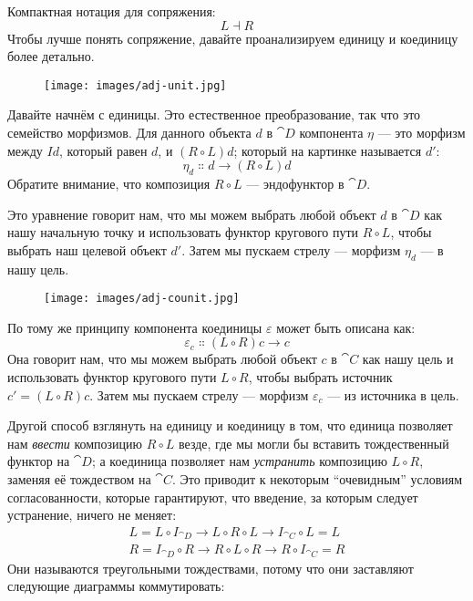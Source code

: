 Компактная нотация для сопряжения:
\[L \dashv R\]
Чтобы лучше понять сопряжение, давайте проанализируем единицу и
коединицу более детально.

\begin{figure}[H]
  \centering
  \texttt{[image: images/adj-unit.jpg]}
\end{figure}

\noindent
Давайте начнём с единицы. Это естественное преобразование, так что это
семейство морфизмов. Для данного объекта $d$ в $\cat{D}$
компонента $\eta$ --- это морфизм между $I d$, который равен
$d$, и $(R \circ L) d$; который на картинке называется
$d'$:
\[\eta_d \Colon d \to (R \circ L) d\]
Обратите внимание, что композиция $R \circ L$ --- эндофунктор в $\cat{D}$.

Это уравнение говорит нам, что мы можем выбрать любой объект $d$ в
$\cat{D}$ как нашу начальную точку и использовать функтор кругового пути
$R \circ L$, чтобы выбрать наш целевой объект $d'$. Затем мы
пускаем стрелу --- морфизм $\eta_d$ --- в нашу цель.

\begin{figure}[H]
  \centering
  \texttt{[image: images/adj-counit.jpg]}
\end{figure}

\noindent
По тому же принципу компонента коединицы $\varepsilon$ может быть описана как:
\[\varepsilon_{c} \Colon (L \circ R) c \to c\]
Она говорит нам, что мы
можем выбрать любой объект $c$ в $\cat{C}$ как нашу цель и использовать
функтор кругового пути $L \circ R$, чтобы выбрать источник
$c' = (L \circ R) c$. Затем мы пускаем стрелу --- морфизм
$\varepsilon_{c}$ --- из источника в цель.

Другой способ взглянуть на единицу и коединицу в том, что единица позволяет нам
\emph{ввести} композицию $R \circ L$ везде, где мы могли бы
вставить тождественный функтор на $\cat{D}$; а коединица позволяет нам
\emph{устранить} композицию $L \circ R$, заменяя её
тождеством на $\cat{C}$. Это приводит к некоторым ``очевидным'' условиям согласованности,
которые гарантируют, что введение, за которым следует устранение,
ничего не меняет:
\begin{gather*}
  L = L \circ I_{\cat{D}} \to L \circ R \circ L \to I_{\cat{C}} \circ L = L \\
  R = I_{\cat{D}} \circ R \to R \circ L \circ R \to R \circ I_{\cat{C}} = R
\end{gather*}
Они называются треугольными тождествами, потому что они заставляют следующие
диаграммы коммутировать:

